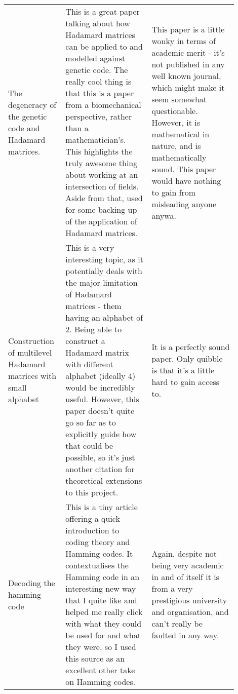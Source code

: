\documentclass{article}
\begin{document}
\begin{center}
{\begin{longtable}{p{0.2\linewidth} p{0.35\linewidth} p{0.35\linewidth}}
    \\

    The degeneracy of the genetic code and Hadamard matrices.  \citep*{DegeneracyHadamard2008Petoukhov} &

    This is a great paper talking about how Hadamard matrices can be applied to
    and modelled against genetic code. The really cool thing is that this is a
    paper from a biomechanical perspective, rather than a mathematician's. This
    highlights the truly awesome thing about working at an intersection of
    fields. Aside from that, used for some backing up of the application of
    Hadamard matrices. &

    This paper is a little wonky in terms of academic merit - it's not published
    in any well known journal, which might make it seem somewhat questionable.
    However, it is mathematical in nature, and is mathematically sound. This
    paper would have nothing to gain from misleading anyone anywa.

    \\

    Construction of multilevel Hadamard matrices with small alphabet \citep*{MultilevelConstruction2008TrinhFan} &

    This is a very interesting topic, as it potentially deals with the major
    limitation of Hadamard matrices - them having an alphabet of 2. Being able
    to construct a Hadamard matrix with different alphabet (ideally 4) would be
    incredibly useful. However, this paper doesn't quite go so far as to
    explicitly guide how that could be possible, so it's just another citation
    for theoretical extensions to this project. &

    It is a perfectly sound paper. Only quibble is that it's a little hard to
    gain access to.

    \\

    Decoding the hamming code \citep*{DecodingHamming2006Eherenborg} &

    This is a tiny article offering a quick introduction to coding theory and
    Hamming codes. It contextualises the Hamming code in an interesting new way
    that I quite like and helped me really click with what they could be used
    for and what they were, so I used this source as an excellent other take on
    Hamming codes. &

    Again, despite not being very academic in and of itself it is from a very
    prestigious university and organisation, and can't really be faulted in any
    way.


\end{longtable}}
\end{center}
\end{document}
